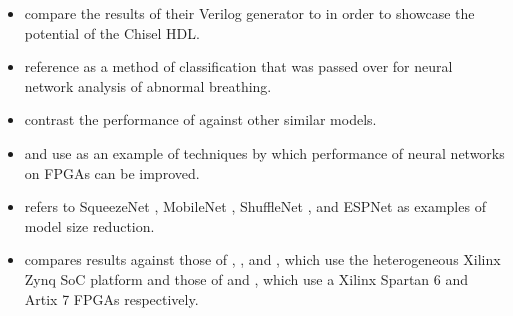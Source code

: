 \documentclass[12pt,letterpaper,english]{article}
\newcommand{\citework}[1]{\citeauthor{#1} \autocite{#1}}
\newcommand{\citeworks}[2]{%
	\citeauthor*{#1} \autocite{#1} and \citeauthor*{#2} \autocite{#2}%
}
\newcommand{\citemoreworks}[3]{%
	\citeauthor*{#1} \autocite{#1},
	\citeauthor*{#2} \autocite{#2}, and
	\citeauthor*{#3} \autocite{#3}%
}
\begin{document}
\begin{itemize}
	\item \citework{madineni2023parameterizable} compare the results of their
	Verilog generator to \autocite{main} in order to showcase the potential of
	the Chisel HDL.
	\item \citework{baedorf2023reverse} reference \autocite{main} as a method of
	classification that was passed over for neural network analysis of abnormal
	breathing.
	\item \citework{phipps2023pre} contrast the performance of \autocite{main}
	against other similar models.
	\item \citeworks{pistellato2023quantization}{yan2023end} use \autocite{main}
	as an example of techniques by which performance of neural networks on FPGAs
	can be improved.
	\item \citeauthor{main} refers to
	SqueezeNet \autocite{iandola2016squeezenet},
	MobileNet \autocites{howard2017mobilenets}{sandler2018mobilenetv2},
	ShuffleNet \autocite{zhang2018shufflenet}, and
	ESPNet \autocite{mehta2018espnet}
	as examples of model size reduction.
	\item \citeauthor{main} compares results against those of
	\citemoreworks{yaozong2019design}{xiaokang2019design}{binfeng2019design},
	which use the heterogeneous Xilinx Zynq SoC platform and those of
	\citeworks{bingchen2019fpga}{hui2021convolutional},
	which use a Xilinx Spartan 6 and Artix 7 FPGAs respectively.
\end{itemize}


\newpage
\printbibliography
\end{document}
